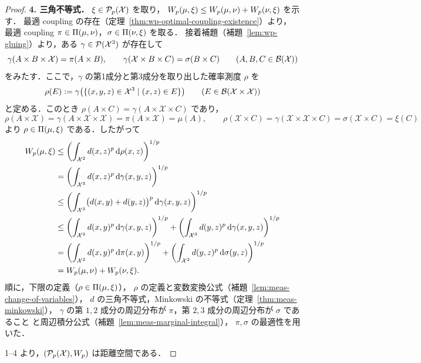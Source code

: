 \begin{proof}
  \textbf{4. 三角不等式．}
  $\xi\in\mathcal{P}_{p}(\mathcal{X})$ を取り，
  $W_p(\mu,\xi)\leq W_p(\mu,\nu)+W_p(\nu,\xi)$ を示す．
  最適 coupling の存在（定理~\ref{thm:wp-optimal-coupling-existence}）より，
  最適 coupling $\pi\in\Pi(\mu,\nu)$，$\sigma\in\Pi(\nu,\xi)$ を取る．
  接着補題（補題~\ref{lem:wp-gluing}）より，ある $\gamma\in\mathcal{P}(\mathcal{X}^3)$ が存在して
  \[
    \gamma(A\times B\times\mathcal{X})=\pi(A\times B),\qquad
    \gamma(\mathcal{X}\times B\times C)=\sigma(B\times C)
    \qquad(A,B,C\in\mathcal{B}(\mathcal{X}))
  \]
  をみたす．ここで，$\gamma$ の第1成分と第3成分を取り出した確率測度 $\rho$ を
  \[
    \rho(E):=\gamma\bigl(\{(x,y,z)\in\mathcal{X}^3\mid(x,z)\in E\}\bigr)
    \qquad(E\in\mathcal{B}(\mathcal{X}\times\mathcal{X}))
  \]
  と定める．このとき $\rho(A\times C)=\gamma(A\times\mathcal{X}\times C)$ であり，
  \[
    \rho(A\times\mathcal{X})=\gamma(A\times\mathcal{X}\times\mathcal{X})
    =\pi(A\times\mathcal{X})=\mu(A),\qquad
    \rho(\mathcal{X}\times C)=\gamma(\mathcal{X}\times\mathcal{X}\times C)
    =\sigma(\mathcal{X}\times C)=\xi(C)
  \]
  より $\rho\in\Pi(\mu,\xi)$ である．したがって
  \[
    \begin{aligned}
      W_p(\mu,\xi)
      &\leq\left(\int_{\mathcal{X}^2}d(x,z)^p\,\mathrm{d}\rho(x,z)\right)^{1/p}\\
      &=\left(\int_{\mathcal{X}^3}d(x,z)^p\,\mathrm{d}\gamma(x,y,z)\right)^{1/p}\\
      &\leq\left(\int_{\mathcal{X}^3}\bigl(d(x,y)+d(y,z)\bigr)^p\,\mathrm{d}\gamma(x,y,z)\right)^{1/p}\\
      &\leq
      \left(\int_{\mathcal{X}^3}d(x,y)^p\,\mathrm{d}\gamma(x,y,z)\right)^{1/p}
      +\left(\int_{\mathcal{X}^3}d(y,z)^p\,\mathrm{d}\gamma(x,y,z)\right)^{1/p}\\
      &=\left(\int_{\mathcal{X}^2}d(x,y)^p\,\mathrm{d}\pi(x,y)\right)^{1/p}
      +\left(\int_{\mathcal{X}^2}d(y,z)^p\,\mathrm{d}\sigma(y,z)\right)^{1/p}\\
      &=W_p(\mu,\nu)+W_p(\nu,\xi).
    \end{aligned}
  \]
  順に，下限の定義（$\rho\in\Pi(\mu,\xi)$），
  $\rho$ の定義と変数変換公式（補題~\ref{lem:meas-change-of-variables}），
  $d$ の三角不等式，Minkowski の不等式（定理~\ref{thm:meas-minkowski}），
  $\gamma$ の第 $1,2$ 成分の周辺分布が $\pi$，第 $2,3$ 成分の周辺分布が $\sigma$ であること
  と周辺積分公式（補題~\ref{lem:meas-marginal-integral}），
  $\pi,\sigma$ の最適性を用いた．

  1--4 より，$(\mathcal{P}_{p}(\mathcal{X}),W_p)$ は距離空間である．
\end{proof}

